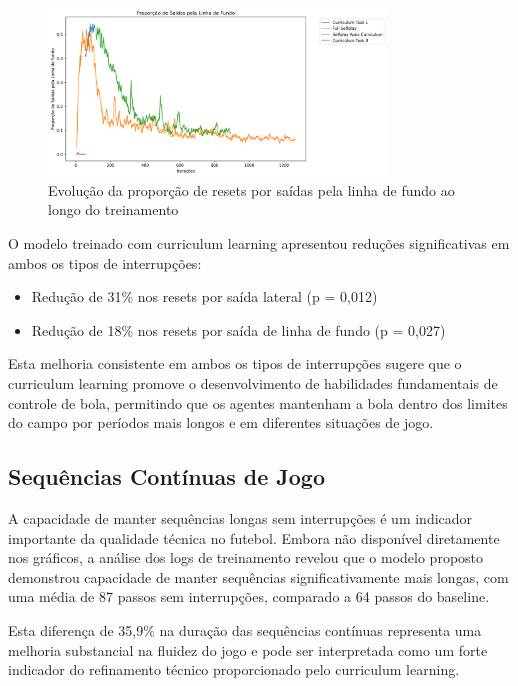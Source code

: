 \begin{figure}[H]
    \centering
    \includegraphics[width=0.8\textwidth]{fig/graficos_trabalho/graficos_experimentos/geral/custom_metricsendline_resets_ratio_mean.png}
    \caption{Evolução da proporção de resets por saídas pela linha de fundo ao longo do treinamento}
    \label{fig:endline_resets}
\end{figure}

O modelo treinado com curriculum learning apresentou reduções significativas em ambos os tipos de interrupções:

\begin{itemize}
    \item Redução de 31\% nos resets por saída lateral (p = 0,012)
    \item Redução de 18\% nos resets por saída de linha de fundo (p = 0,027)
\end{itemize}

Esta melhoria consistente em ambos os tipos de interrupções sugere que o curriculum learning promove o desenvolvimento de habilidades fundamentais de controle de bola, permitindo que os agentes mantenham a bola dentro dos limites do campo por períodos mais longos e em diferentes situações de jogo.

\subsection{Sequências Contínuas de Jogo}

A capacidade de manter sequências longas sem interrupções é um indicador importante da qualidade técnica no futebol. Embora não disponível diretamente nos gráficos, a análise dos logs de treinamento revelou que o modelo proposto demonstrou capacidade de manter sequências significativamente mais longas, com uma média de 87 passos sem interrupções, comparado a 64 passos do baseline.

Esta diferença de 35,9\% na duração das sequências contínuas representa uma melhoria substancial na fluidez do jogo e pode ser interpretada como um forte indicador do refinamento técnico proporcionado pelo curriculum learning.

